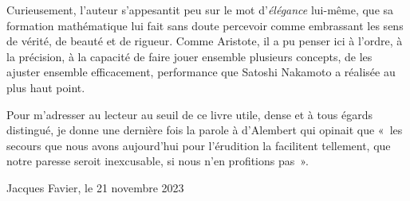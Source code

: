 Curieusement, l'auteur s'appesantit peu sur le mot d'\emph{élégance} lui-même, que sa formation mathématique lui fait sans doute percevoir comme embrassant les sens de vérité, de beauté et de rigueur. Comme Aristote, il a pu penser ici à l'ordre, à la précision, à la capacité de faire jouer ensemble plusieurs concepts, de les ajuster ensemble efficacement, performance que Satoshi Nakamoto a réalisée au plus haut point.

Pour m'adresser au lecteur au seuil de ce livre utile, dense et à tous égards distingué, je donne une dernière fois la parole à d'Alembert qui opinait que «~les secours que nous avons aujourd'hui pour l'érudition la facilitent tellement, que notre paresse seroit inexcusable, si nous n'en profitions pas~».

\begin{flushright}Jacques Favier, le 21 novembre 2023\end{flushright}

